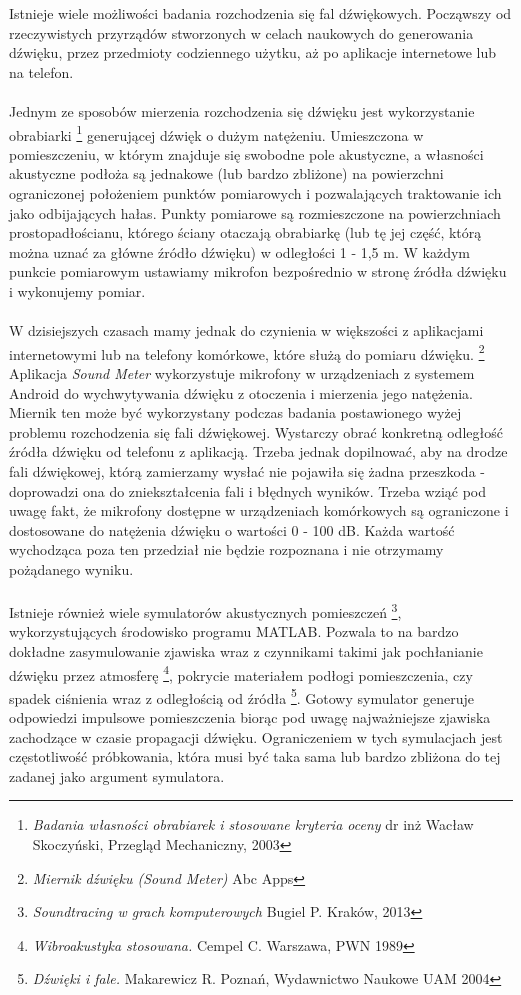 \documentclass[a4paper, 12pt]{article}
\begin{document}
Istnieje wiele możliwości badania rozchodzenia się fal dźwiękowych. Począwszy od rzeczywistych przyrządów stworzonych w celach naukowych do generowania dźwięku, przez przedmioty codziennego użytku, aż po aplikacje internetowe lub na telefon.
\\ \\ 
Jednym ze sposobów mierzenia rozchodzenia się dźwięku jest wykorzystanie obrabiarki \footnote{\textit{Badania własności obrabiarek i stosowane kryteria oceny} dr inż Wacław Skoczyński, Przegląd Mechaniczny, 2003} generującej dźwięk o dużym natężeniu. Umieszczona w pomieszczeniu, w którym znajduje się swobodne pole akustyczne, a własności akustyczne podłoża są jednakowe (lub bardzo zbliżone) na powierzchni ograniczonej położeniem punktów pomiarowych i pozwalających traktowanie ich jako odbijających hałas. Punkty pomiarowe są rozmieszczone na powierzchniach prostopadłościanu, którego ściany otaczają obrabiarkę (lub tę jej część, którą można uznać za główne źródło dźwięku) w odległości 1 - 1,5 m. W każdym punkcie pomiarowym ustawiamy mikrofon bezpośrednio w stronę źródła dźwięku i wykonujemy pomiar.
\\ \\
W dzisiejszych czasach mamy jednak do czynienia w większości z aplikacjami internetowymi lub na telefony komórkowe, które służą do pomiaru dźwięku. \footnote{\textit{Miernik dźwięku (Sound Meter)} Abc Apps} Aplikacja \textit{Sound Meter} wykorzystuje mikrofony w urządzeniach z systemem Android do wychwytywania dźwięku z otoczenia i mierzenia jego natężenia. Miernik ten może być wykorzystany podczas badania postawionego wyżej problemu rozchodzenia się fali dźwiękowej. Wystarczy obrać konkretną odległość źródła dźwięku od telefonu z aplikacją. Trzeba jednak dopilnować, aby na drodze fali dźwiękowej, którą zamierzamy wysłać nie pojawiła się żadna przeszkoda - doprowadzi ona do zniekształcenia fali i błędnych wyników. Trzeba wziąć pod uwagę fakt, że mikrofony dostępne w urządzeniach komórkowych są ograniczone i dostosowane do natężenia dźwięku o wartości 0 - 100 dB. Każda wartość wychodząca poza ten przedział nie będzie rozpoznana i nie otrzymamy pożądanego wyniku.
\\ \\
Istnieje również wiele symulatorów akustycznych pomieszczeń \footnote{\textit{Soundtracing w grach komputerowych} Bugiel P. Kraków, 2013}, wykorzystujących środowisko programu MATLAB. Pozwala to na bardzo dokładne zasymulowanie zjawiska wraz z czynnikami takimi jak pochłanianie dźwięku przez atmosferę \footnote{\textit{Wibroakustyka stosowana.} Cempel C. Warszawa, PWN 1989}, pokrycie materiałem podłogi pomieszczenia, czy spadek ciśnienia wraz z odległością od źródła \footnote{\textit{Dźwięki i fale.} Makarewicz R. Poznań, Wydawnictwo Naukowe UAM 2004}. Gotowy symulator generuje odpowiedzi impulsowe pomieszczenia biorąc pod uwagę najważniejsze zjawiska zachodzące w czasie propagacji dźwięku. Ograniczeniem w tych symulacjach jest częstotliwość próbkowania, która musi być taka sama lub bardzo zbliżona do tej zadanej jako argument symulatora.
\end{document}
